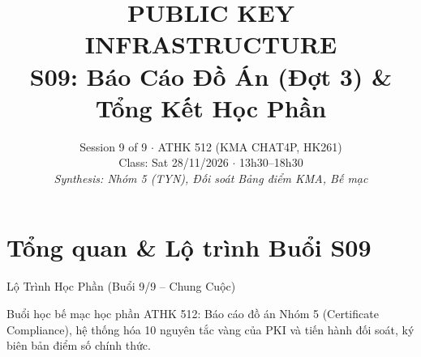 
\title{\color{hcmutblue}\textbf{\LARGE PUBLIC KEY INFRASTRUCTURE}\\[0.25em]
       \color{hcmutblue}\textbf{\large S09: Báo Cáo Đồ Án (Đợt 3) \& Tổng Kết Học Phần}}
\date{\footnotesize Session 9 of 9 $\cdot$ ATHK 512 (KMA CHAT4P, HK261)\\
      Class: Sat 28/11/2026 $\cdot$ 13h30--18h30\\
      \textit{Synthesis: Nhóm 5 (TYN), Đối soát Bảng điểm KMA, Bế mạc}}


\PKItitleframe

\section{Tổng quan \& Lộ trình Buổi S09}

\begin{frame}{Lộ Trình Học Phần (Buổi 9/9 -- Chung Cuộc)}
  \centering
  \vspace{0.4em}
  \raggedright\small
  Buổi học bế mạc học phần ATHK 512: Báo cáo đồ án Nhóm 5 (Certificate Compliance), hệ thống hóa 10 nguyên tắc vàng của PKI và tiến hành đối soát, ký biên bản điểm số chính thức.
\end{frame}

